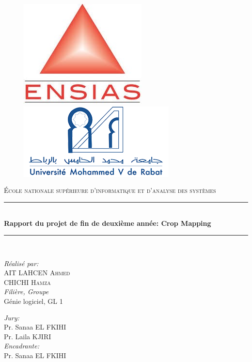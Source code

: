 \documentclass[12pt, openany]{report}
\newcommand{\HRule}{\rule{\linewidth}{0.5mm}}
\begin{document}
\begin{titlepage}
  \begin{sffamily}
  \begin{center}

	\begin{figure}[t]
	   \begin{minipage}{0.48\textwidth } 
	     \includegraphics[width=.3\linewidth , left]{ensias.JPG}
	   \end{minipage}\hfill
	   \begin{minipage}{0.48\textwidth }
	     \includegraphics[width=.4\linewidth , right]{univesite.JPG}
	   \end{minipage}
	\end{figure}
     
    \textsc{\LARGE École nationale supérieure d'informatique et d'analyse des systèmes}\\[4cm]


    \HRule \\[0.5cm]
    { \huge \bfseries Rapport du projet de fin de deuxième année: Crop Mapping\\[0.4cm] }
	\HRule\\[4cm]

    \begin{minipage}{0.45\textwidth}
      \begin{flushleft} \large
        \emph{Réalisé par:}\\
            AIT LAHCEN \textsc{Ahmed}\\
	        CHICHI \textsc{Hamza}\\
       \emph{Filière, Groupe}\\
	        Génie logiciel, GL 1\\
      \end{flushleft}
    \end{minipage}
    \begin{minipage}{0.45\textwidth}
      \begin{flushright} \large
       \emph{Jury:}\\
	Pr. Sanaa \textsc{EL FKIHI}\\
	Pr. Laila \textsc{KJIRI}\\
	\emph{Encadrante:}\\
	Pr. Sanaa \textsc{EL FKIHI}\\
	\end{flushright}
    \end{minipage}


\end{center}
\end{sffamily}
\end{titlepage}
\end{document}
